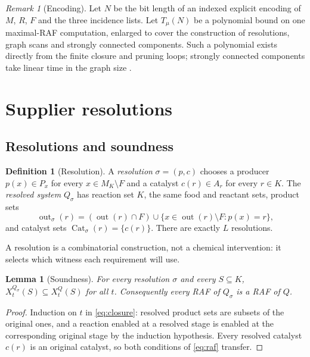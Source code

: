 \documentclass[11pt,a4paper]{article}
\theoremstyle{plain}
\newtheorem{lemma}[theorem]{Lemma}
\theoremstyle{definition}
\newtheorem{definition}[theorem]{Definition}
\theoremstyle{remark}
\newtheorem{remark}[theorem]{Remark}
\newcommand{\Cat}{\operatorname{Cat}}
\newcommand{\out}{\operatorname{out}}
\begin{document}
\begin{remark}[Encoding]\label{rem:encoding}
Let $N$ be the bit length of an indexed explicit encoding of $M$, $R$, $F$ and the three incidence lists. Let $T_\mu(N)$ be a polynomial bound on one maximal-RAF computation, enlarged to cover the construction of resolutions, graph scans and strongly connected components. Such a polynomial exists directly from the finite closure and pruning loops; strongly connected components take linear time in the graph size \cite{tarjan1972depth,sharir1981strong}.
\end{remark}

\section{Supplier resolutions}\label{sec:resolutions}

\subsection{Resolutions and soundness}

\begin{definition}[Resolution]\label{def:resolution}
A \emph{resolution} $\sigma=(p,c)$ chooses a producer $p(x)\in P_x$ for every $x\in M_K\setminus F$ and a catalyst $c(r)\in A_r$ for every $r\in K$. The \emph{resolved system} $Q_\sigma$ has reaction set $K$, the same food and reactant sets, product sets
\[
 \out_\sigma(r)=(\out(r)\cap F)\cup\{x\in\out(r)\setminus F:p(x)=r\},
\]
and catalyst sets $\Cat_\sigma(r)=\{c(r)\}$. There are exactly $L$ resolutions.
\end{definition}

A resolution is a combinatorial construction, not a chemical intervention: it selects which witness each requirement will use.

\begin{lemma}[Soundness]\label{lem:sound}
For every resolution $\sigma$ and every $S\subseteq K$, $X_t^{Q_\sigma}(S)\subseteq X_t^{Q}(S)$ for all $t$. Consequently every RAF of $Q_\sigma$ is a RAF of $Q$.
\end{lemma}
\begin{proof}
Induction on $t$ in \eqref{eq:closure}: resolved product sets are subsets of the original ones, and a reaction enabled at a resolved stage is enabled at the corresponding original stage by the induction hypothesis. Every resolved catalyst $c(r)$ is an original catalyst, so both conditions of \eqref{eq:raf} transfer.
\end{proof}
\end{document}
